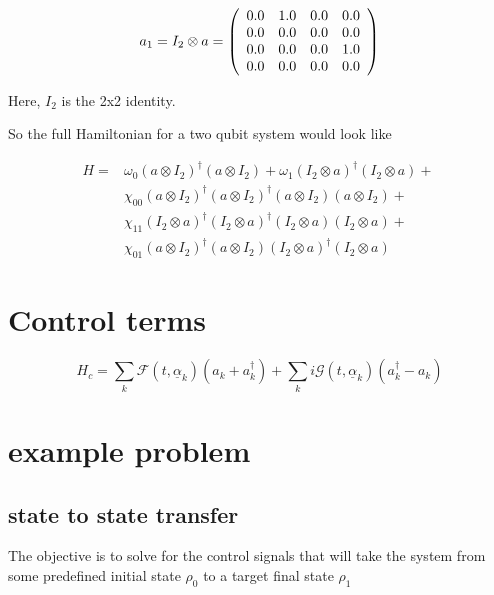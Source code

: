 \documentclass{article}
\begin{document}
\begin{equation*}a_1 = I_2 \otimes a = \left(\begin{array}{*{11}c}0.0 & 1.0 & 0.0 & 0.0\\0.0 & 0.0 & 0.0 & 0.0\\0.0 & 0.0 & 0.0 & 1.0\\0.0 & 0.0 & 0.0 & 0.0\\\end{array}\right)\end{equation*}

Here, $I_2$ is the 2x2 identity.

So the full Hamiltonian for a two qubit system would look like 

\[
\begin{array}{ll}
H = & \omega_0 (a \otimes I_2)^{\dagger} (a \otimes I_2) + \omega_1 (I_2 \otimes a)^{\dagger} (I_2 \otimes a)  +\\
& \chi_{00} (a \otimes I_2)^{\dagger} (a \otimes I_2)^{\dagger} (a \otimes I_2) (a \otimes I_2) +\\
& \chi_{11}  (I_2 \otimes a)^{\dagger} (I_2 \otimes a)^{\dagger} (I_2 \otimes a) (I_2 \otimes a) +\\
& \chi_{01}  (a \otimes I_2)^{\dagger} (a \otimes I_2) (I_2 \otimes a)^{\dagger} (I_2 \otimes a) 
\end{array}\
\]

\section{Control terms}
\begin{equation}
H_c = \sum_k \mathcal{F}(t,\underline{\alpha}_k) (a_k + a_k^\dagger) + \sum_k i\mathcal{G}(t,\underline{\alpha}_k) (a_k^\dagger-a_k) 
\end{equation}


\section{example problem}
\subsection{state to state transfer}
The objective is to solve for the control signals that will take the system from some predefined initial state $\rho_0$ to a target final state $\rho_1$
\end{document}

